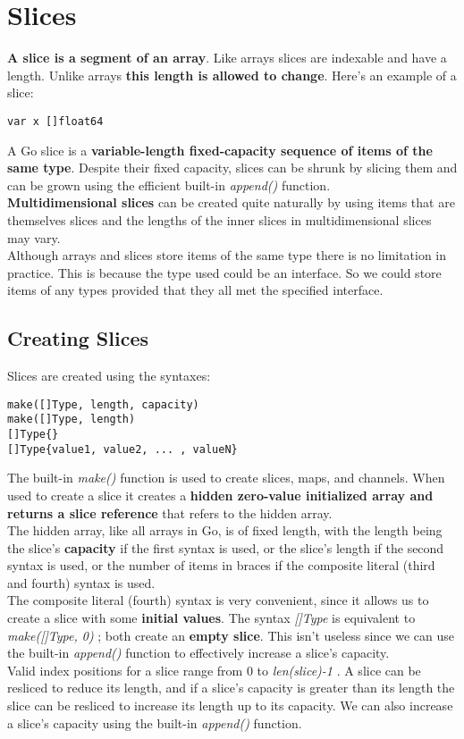 \documentclass[10pt,letterpaper]{report}
\begin{document}
\section{Slices}
\textbf{A slice is a segment of an array}. Like arrays slices are indexable and have a length. Unlike arrays \textbf{this length is allowed to change}. Here's an example of a slice:
\begin{lstlisting}
var x []float64
\end{lstlisting}
A Go slice is a \textbf{variable-length fixed-capacity sequence of items of the same type}. Despite their fixed capacity, slices can be shrunk by slicing them and can be grown using the efficient built-in \textit{append()} function.\\
\textbf{Multidimensional slices} can be created quite naturally by using items that are themselves slices and the lengths of the inner slices in multidimensional slices may vary.\\
Although arrays and slices store items of the same type there is no limitation in practice. This is because the type used could be an interface. So we could store items of any types provided that they all met the specified interface.\\
\subsection{Creating Slices}
Slices are created using the syntaxes:
\begin{lstlisting}
make([]Type, length, capacity)
make([]Type, length)
[]Type{}
[]Type{value1, value2, ... , valueN}
\end{lstlisting}
The built-in \textit{make()} function is used to create slices, maps, and channels. When used to create a slice it creates a \textbf{hidden zero-value initialized array and returns a slice reference} that refers to the hidden array.\\
The hidden array, like all arrays in Go, is of fixed length, with the length being the slice's \textbf{capacity} if the first syntax is used, or the slice's length if the second syntax is used, or the number of items in braces if the composite literal (third and fourth) syntax is used.\\
The composite literal (fourth) syntax is very convenient, since it allows us to create a slice with some \textbf{initial values}. The syntax \textit{[]Type{}} is equivalent to \textit{make([]Type, 0)} ; both create an \textbf{empty slice}. This isn't useless since we can use the built-in \textit{append()} function to effectively increase a slice's capacity.\\
Valid index positions for a slice range from 0 to \textit{len(slice)-1} . A slice can be resliced to reduce its length, and if a slice's capacity is greater than its length the slice can be resliced to increase its length up to its capacity. We can also increase a slice's capacity using the built-in \textit{append()} function.\\
\end{document}
